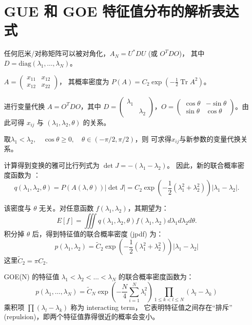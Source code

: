 \section{GUE 和 GOE 特征值分布的解析表达式}
任何厄米/对称矩阵可以被对角化，$A_N = U^*DU$ (或 $O^TDO$)，
其中 $D = \text{diag}(\lambda_1, \dots, \lambda_N)$。

\begin{example}
$A = \begin{pmatrix} x_{11} & x_{12} \\ x_{12} & x_{22} \end{pmatrix}$，
其概率密度为 $P(A) = C_2 \exp(-\frac{1}{2}\operatorname{Tr}A^2)$。

进行变量代换 $A=O^TDO$，其中 $D = \begin{pmatrix} \lambda_1 & \\ & \lambda_2 \end{pmatrix}$，$O = \begin{pmatrix} \cos\theta & -\sin\theta \\ \sin\theta & \cos\theta \end{pmatrix}$。由此可得 $x_{ij}$ 与 $(\lambda_1, \lambda_2, \theta)$ 的关系。

取$\lambda_1<\lambda_2,\quad \cos \theta\geq 0,\quad \theta\in(-\pi/2,\pi/2)$，则
可求得$x_{ij}$与新参数的变量代换关系。

计算得到变换的雅可比行列式为 $\det J = -(\lambda_1-\lambda_2)$。
因此，新的联合概率密度函数为 ：
\[q(\lambda_1, \lambda_2, \theta) = P(A(\lambda, \theta))|\det J| = C_2 \exp(-\frac{1}{2}(\lambda_1^2 + \lambda_2^2)) |\lambda_1 - \lambda_2|.\]

该密度与 $\theta$ 无关。对任意函数 $f(\lambda_1, \lambda_2)$，其期望为：
\[E[f] = \iiint q(\lambda_1, \lambda_2, \theta) f(\lambda_1, \lambda_2) d\lambda_1 d\lambda_2 d\theta.\]
积分掉 $\theta$ 后，得到特征值的联合概率密度 (jpdf) 为：
\[ p(\lambda_1, \lambda_2) = \tilde{C}_2 \exp(-\frac{1}{2}(\lambda_1^2 + \lambda_2^2)) |\lambda_1 - \lambda_2| \]
这里$\tilde{C}_2=\pi C_2.$
\end{example}

\begin{theorem}
GOE(N) 的特征值 $\lambda_1 < \lambda_2 < \dots < \lambda_N$ 的联合概率密度函数为：
\[ p(\lambda_1, \dots, \lambda_N) = \tilde{C}_N \exp\left(-\frac{N}{4} \sum_{i=1}^N \lambda_i^2\right) \prod_{1 \le k < l \le N} (\lambda_l - \lambda_k) \]
乘积项 $\prod (\lambda_l - \lambda_k)$ 称为 interacting term，
它表明特征值之间存在“排斥” (repulsion)，即两个特征值靠得很近的概率会变小。
\end{theorem}

